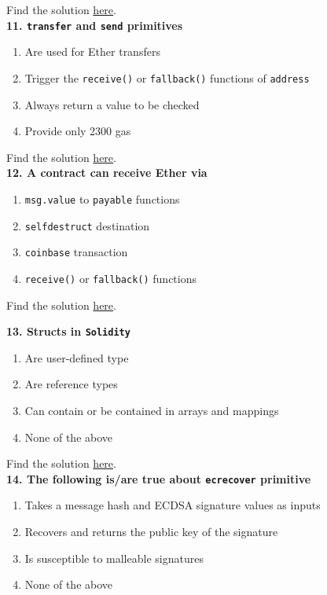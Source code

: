 Find the solution \hyperref[sec:exam2_q10]{here}.\\

\textbf{11. \texttt{transfer} and \texttt{send} primitives}

\begin{enumerate}[label=\Alph*.]
    \item Are used for Ether transfers
    \item Trigger the \verb|receive()| or \verb|fallback()| functions of \verb|address|
    \item Always return a value to be checked
    \item Provide only 2300 gas
\end{enumerate}

Find the solution \hyperref[sec:exam2_q11]{here}.\\

\textbf{12. A contract can receive Ether via}

\begin{enumerate}[label=\Alph*.]
    \item\verb|msg.value| to \verb|payable| functions
    \item\verb|selfdestruct| destination
    \item\verb|coinbase| transaction
    \item\verb|receive()| or \verb|fallback()| functions
\end{enumerate}

Find the solution \hyperref[sec:exam2_q12]{here}.\\

\pagebreak

\textbf{13. Structs in \texttt{Solidity}}

\begin{enumerate}[label=\Alph*.]
    \item Are user-defined type
    \item Are reference types
    \item Can contain or be contained in arrays and mappings
    \item None of the above
\end{enumerate}

Find the solution \hyperref[sec:exam2_q13]{here}.\\

\textbf{14. The following is/are true about \texttt{ecrecover} primitive}

\begin{enumerate}[label=\Alph*.]
    \item Takes a message hash and ECDSA signature values as inputs
    \item Recovers and returns the public key of the signature
    \item Is susceptible to malleable signatures
    \item None of the above
\end{enumerate}

